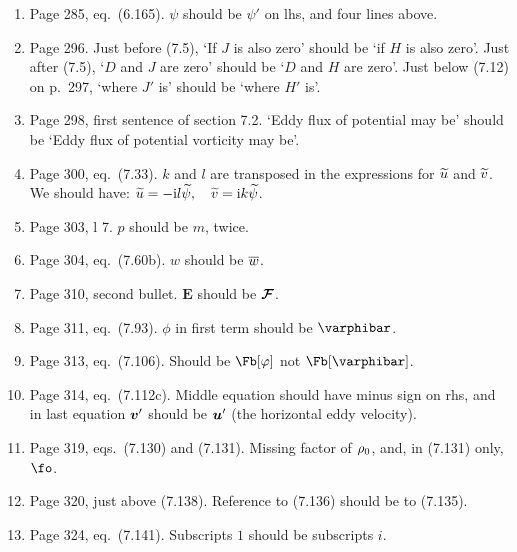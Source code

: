 \documentclass[10pt]{article}
\newcommand{\eq}{eq.\ } \newcommand{\Eq}{Eq.\ }
\begin{document}
\begin{enumerate}
\item Page 285, \eq (6.165). $\psi$ should be $\psi'$ on lhs, and four lines above.

\item Page 296. Just before (7.5), `If $J$ is also zero' should be `if $H$ is also zero'. Just after (7.5), `$D$ and $J$ are zero' should be `$D$ and $H$ are zero'. Just below (7.12) on p.\ 297, `where $J'$ is' should be `where $H'$ is'.

\item Page 298, first sentence of section 7.2. `Eddy flux of potential may be' should be `Eddy flux of potential vorticity may be'.

\item Page 300, \eq (7.33). $k$ and $l$ are transposed in the expressions for $\widetilde u$ and $\widetilde v$. We should have:
     $  \widetilde u  =  - \mathrm{i} l \widetilde \psi,  \quad \widetilde v = \mathrm{i} k \widetilde \psi$.

\item Page 303, l 7. $p$ should be $m$, twice.

\item Page 304, \eq (7.60b). $w$ should be $\overline w$.

\item Page 310, second bullet. $\bm E$ should be $\bm{\mathcal F}$.

\item Page 311, \eq (7.93). $\phi$ in first term should be $\varphibar$.

\item Page 313, \eq (7.106). Should be $\Fb[\varphi]$ not $\Fb[\varphibar]$.

\item Page 314, \eq (7.112c). Middle equation should have minus sign on rhs, and in last equation ${\bm {v}}'$ should be ${\bm {u}}'$ (the horizontal eddy velocity).


\item Page 319, eqs.\ (7.130) and (7.131). Missing factor of $\rho_0$, and, in (7.131) only, $\fo$.

\item Page 320, just above (7.138). Reference to (7.136) should be to (7.135).

\item Page 324, \eq (7.141). Subscripts $1$ should be subscripts $i$.



\end{enumerate}
\end{document}
